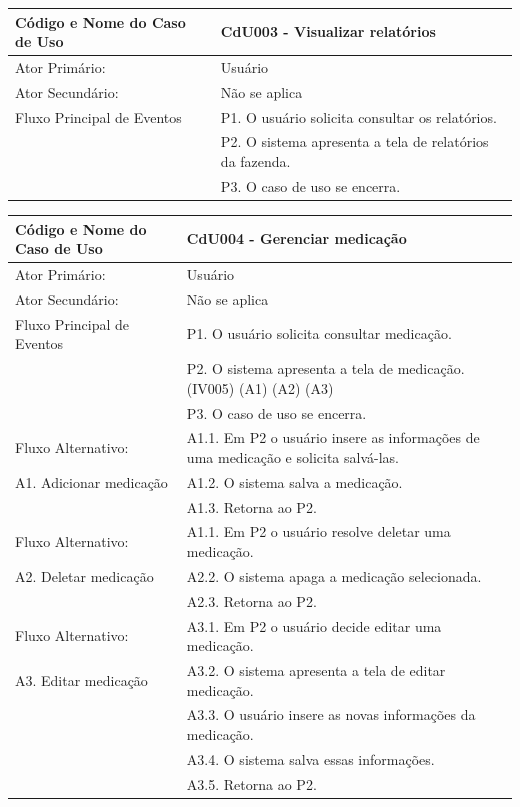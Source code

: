 \documentclass[12pt]{article}
\begin{document}
\begin{titlepage}
\begin{center}
  \begin{tabular}{ | l |  p{10cm} |}
    \hline
    Código e Nome do Caso de Uso & CdU003 - Visualizar relatórios \\ \hline
    Ator Primário: & Usuário \\ 
    Ator Secundário: & Não se aplica \\ \hline
    Fluxo Principal de Eventos & P1. O usuário solicita consultar os relatórios. \\
			       & P2. O sistema apresenta a tela de relatórios da fazenda. \\
                               & P3. O caso de uso se encerra. \\
    \hline
  \end{tabular}
\end{center}



\begin{center}
  \begin{tabular}{ | l |  p{10cm} |}
    \hline
    Código e Nome do Caso de Uso & CdU004 - Gerenciar medicação \\ \hline
    Ator Primário: & Usuário \\ 
    Ator Secundário: & Não se aplica \\ \hline
    Fluxo Principal de Eventos & P1. O usuário solicita consultar medicação. \\
			       & P2. O sistema apresenta a tela de medicação. (IV005) (A1) (A2) (A3) \\
                               & P3. O caso de uso se encerra. \\ \hline
    Fluxo Alternativo:         & A1.1. Em P2 o usuário insere as informações de uma medicação e solicita salvá-las. \\
    A1. Adicionar medicação    & A1.2. O sistema salva a medicação. \\ 
			       & A1.3. Retorna ao P2. \\ \hline
    Fluxo Alternativo:         & A1.1. Em P2 o usuário resolve deletar uma medicação. \\
    A2. Deletar medicação      & A2.2. O sistema apaga a medicação selecionada. \\
			       & A2.3. Retorna ao P2. \\ \hline
    Fluxo Alternativo:         & A3.1. Em P2 o usuário decide editar uma medicação. \\
    A3. Editar medicação       & A3.2. O sistema apresenta a tela de editar medicação. \\
			       & A3.3. O usuário insere as novas informações da medicação. \\
                               & A3.4. O sistema salva essas informações. \\
			       & A3.5. Retorna ao P2. \\
    \hline
  \end{tabular}
\end{center}


\end{titlepage}
\end{document}
